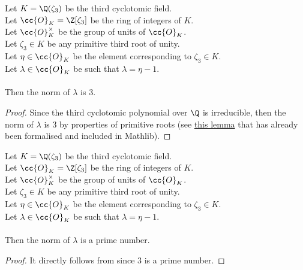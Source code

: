 \begin{lemma}
    \label{lmm:norm_lambda}
    \leanok
    Let $K = \Q(\zeta_3)$ be the third cyclotomic field. \\
    Let $\cc{O}_K = \Z[\zeta_3]$ be the ring of integers of $K$. \\
    Let $\cc{O}^\times_K$ be the group of units of $\cc{O}_K$. \\
    Let $\zeta_3 \in K$ be any primitive third root of unity. \\
    Let $\eta \in \cc{O}_K$ be the element corresponding to $\zeta_3 \in K$. \\
    Let $\lambda \in \cc{O}_K$ be such that $\lambda = \eta -1$. \\\\
    Then the norm of $\lambda$ is $3$.
\end{lemma}
\begin{proof}
    \leanok
    Since the third cyclotomic polynomial over $\Q$ is irreducible, then the norm of $\lambda$ is $3$
    by properties of primitive roots (see
    \href{https://pitmonticone.github.io/FLT3/docs/Mathlib/NumberTheory/Cyclotomic/PrimitiveRoots.html#IsPrimitiveRoot.sub_one_norm_prime}{this lemma}
    that has already been formalised and included in Mathlib).
\end{proof}

\begin{lemma}
    \label{lmm:norm_lambda_prime}
    \leanok
    Let $K = \Q(\zeta_3)$ be the third cyclotomic field. \\
    Let $\cc{O}_K = \Z[\zeta_3]$ be the ring of integers of $K$. \\
    Let $\cc{O}^\times_K$ be the group of units of $\cc{O}_K$. \\
    Let $\zeta_3 \in K$ be any primitive third root of unity. \\
    Let $\eta \in \cc{O}_K$ be the element corresponding to $\zeta_3 \in K$. \\
    Let $\lambda \in \cc{O}_K$ be such that $\lambda = \eta -1$. \\\\
    Then the norm of $\lambda$ is a prime number.
\end{lemma}
\begin{proof}
    \leanok
    It directly follows from  since $3$ is a prime number.
\end{proof}

